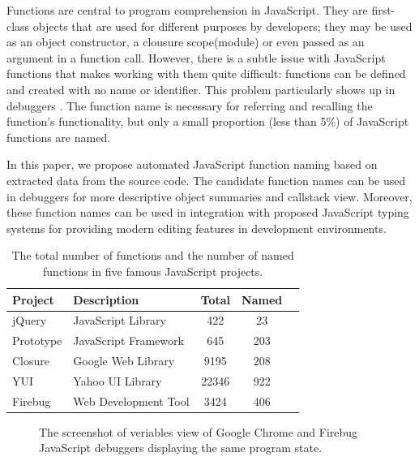 \documentclass{acm_proc_article-sp}
\begin{document}
Functions are central to program comprehension in JavaScript. They are first-class objects that are used for different purposes by developers; 
they may be used as an object  constructor, a clousure scope(module) or even  passed as an argument in a function call. However, there is a subtle issue with JavaScript functions that makes working with them quite difficult: functions can be defined and created with no name or identifier. This problem particularly shows up in debuggers \cite{Zaytsev}. The function name is necessary for referring and recalling the function's functionality, but only a small proportion (less than 5\%) of JavaScript functions are named.

In this paper, we propose automated JavaScript function naming based on extracted data from the source code. The candidate function names can be used in debuggers for more descriptive object summaries and callstack view. Moreover, these function names can be used in integration with proposed JavaScript typing systems for providing modern editing features in development environments.


\begin{table}
\centering
\caption{The total number of functions and the number of named functions in five famous JavaScript projects.}
  \begin{tabular}{ | l | l | c | c | c |}
  \hline
   Project & Description & Total & Named \\ 
  \hline 
   jQuery & JavaScript Library & 422 & 23 \\ 
  \hline 
   Prototype & JavaScript Framework & 645 & 203 \\ 
  \hline 
   Closure & Google Web Library & 9195 & 208 \\ 
  \hline 
   YUI &  Yahoo UI Library & 22346 & 922 \\ 
  \hline 
   Firebug & Web Development Tool & 3424 & 406 \\ 
  \hline 
  \end{tabular}
 \label{functions} 
\end{table}    


\begin{figure}[htp]
\centerline{
\hfil
{}}
\caption{The screenshot of veriables view of Google Chrome and Firebug JavaScript debuggers displaying the same program state.}
\label{debuggers-objects}
\end{figure}
\end{document}
